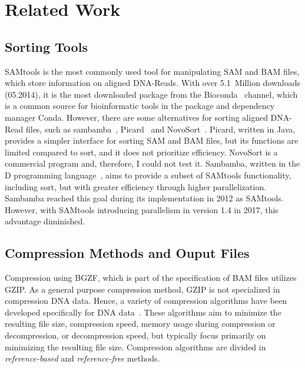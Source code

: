 \section{Related Work}

\subsection{Sorting Tools}
SAMtools is the most commonly used tool for manipulating SAM and BAM files, which store information on aligned DNA-Reads. With over 5.1~Million downloads (05.2014), it is the most downloaded package from the Bioconda~\cite{the_bioconda_team_bioconda_2018} channel, which is a common source for bioinformatic tools in the package and dependency manager Conda. However, there are some alternatives for sorting aligned DNA-Read files, such as sambamba~\cite{tarasov_sambamba_2015}, Picard~\cite{Picard2019toolkit} and NovoSort~\cite{noauthor_novosort_nodate}. Picard, written in Java, provides a simpler interface for sorting SAM and BAM files, but its functions are limited compared to sort, and it does not prioritize efficiency. NovoSort is a commercial program and, therefore, I could not test it. Sambamba, written in the D programming language~\cite{alexandrescu_d_2010}, aims to provide a subset of SAMtools functionality, including sort, but with greater efficiency through higher parallelization. Sambamba reached this goal during its implementation in 2012 as SAMtools. However, with SAMtools introducing parallelism in version 1.4 in 2017, this advantage diminished.\\

\subsection{Compression Methods and Ouput Files}
Compression using BGZF, which is part of the specification of BAM files utilizes GZIP. As a general purpose compression method, GZIP is not specialized in compression DNA data. Hence, a variety of compression algorithms have been developed specifically for DNA data~\cite{hosseini_survey_2016}. These algorithms aim to minimize the resulting file size, compression speed, memory usage during compression or decompression, or decompression speed, but typically focus primarily on minimizing the resulting file size. Compression algorithms are divided in \textit{reference-based} and \textit{reference-free} methods. \\

